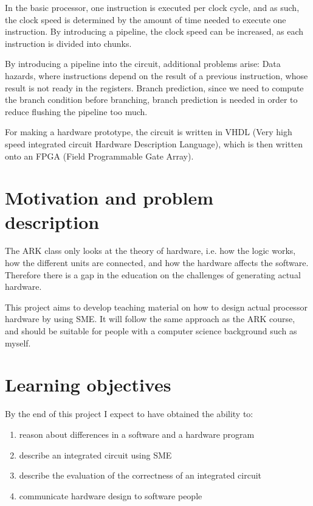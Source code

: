 \documentclass[a4paper]{article}
\begin{document}
In the basic processor, one instruction is executed per clock cycle, and as
such, the clock speed is determined by the amount of time needed to execute one
instruction. By introducing a pipeline, the clock speed can be increased, as
each instruction is divided into chunks.

By introducing a pipeline into the circuit, additional problems arise: Data
hazards, where instructions depend on the result of a previous instruction,
whose result is not ready in the registers. Branch prediction, since we need to
compute the branch condition before branching, branch prediction is needed in
order to reduce flushing the pipeline too much.

For making a hardware prototype, the circuit is written in VHDL (Very high
speed integrated circuit Hardware Description Language), which is then written
onto an FPGA (Field Programmable Gate Array).

\section*{Motivation and problem description}
The ARK class only looks at the theory of hardware, i.e. how the logic works,
how the different units are connected, and how the hardware affects the
software.  Therefore there is a gap in the education on the challenges of
generating actual hardware.

This project aims to develop teaching material on how to design actual
processor hardware by using SME. It will follow the same approach as the ARK
course, and should be suitable for people with a computer science background
such as myself.

\section*{Learning objectives}
By the end of this project I expect to have obtained the ability to:
\begin{enumerate}
    \item reason about differences in a software and a hardware program

    \item describe an integrated circuit using SME

    \item describe the evaluation of the correctness of an integrated circuit

    \item communicate hardware design to software people
\end{enumerate}
\end{document}
